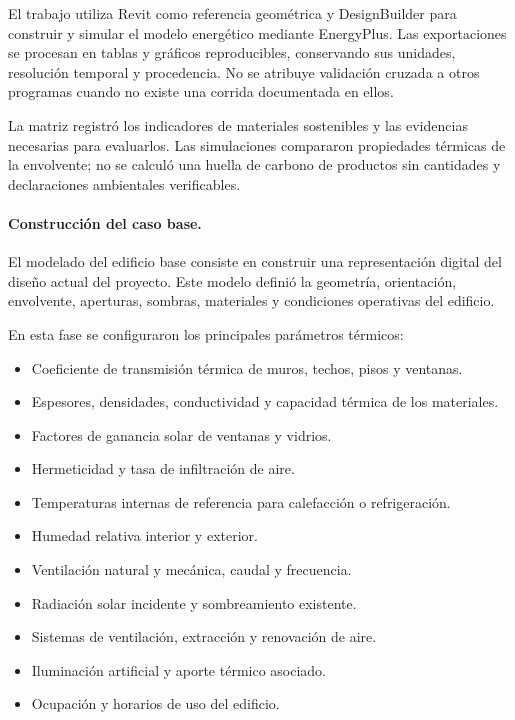 \begin{textoDosTercios}
El trabajo utiliza Revit como referencia geométrica y DesignBuilder para construir y simular el modelo energético mediante EnergyPlus. Las exportaciones se procesan en tablas y gráficos reproducibles, conservando sus unidades, resolución temporal y procedencia. No se atribuye validación cruzada a otros programas cuando no existe una corrida documentada en ellos.

La matriz registró los indicadores de materiales sostenibles y las evidencias necesarias para evaluarlos. Las simulaciones compararon propiedades térmicas de la envolvente; no se calculó una huella de carbono de productos sin cantidades y declaraciones ambientales verificables.

\paragraph{Construcción del caso base.}

El modelado del edificio base consiste en construir una representación digital del diseño actual del proyecto. Este modelo definió la geometría, orientación, envolvente, aperturas, sombras, materiales y condiciones operativas del edificio.

En esta fase se configuraron los principales parámetros térmicos:
\end{textoDosTercios}

\begin{textoDosTercios}
\begin{itemize}
  \item Coeficiente de transmisión térmica de muros, techos, pisos y ventanas.
  \item Espesores, densidades, conductividad y capacidad térmica de los materiales.
  \item Factores de ganancia solar de ventanas y vidrios.
  \item Hermeticidad y tasa de infiltración de aire.
  \item Temperaturas internas de referencia para calefacción o refrigeración.
  \item Humedad relativa interior y exterior.
  \item Ventilación natural y mecánica, caudal y frecuencia.
  \item Radiación solar incidente y sombreamiento existente.
  \item Sistemas de ventilación, extracción y renovación de aire.
  \item Iluminación artificial y aporte térmico asociado.
  \item Ocupación y horarios de uso del edificio.
\end{itemize}
\end{textoDosTercios}

